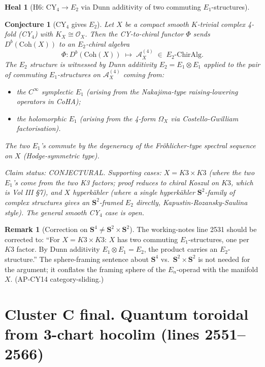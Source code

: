 \documentclass[11pt]{amsart}
\newtheorem{conjecture}[theorem]{Conjecture}
\theoremstyle{definition}
\newtheorem{heal}[attack]{Heal}
\newtheorem{remark}{Remark}
\providecommand{\Coh}{\mathrm{Coh}}
\providecommand{\Eone}{E_1}
\providecommand{\Etwo}{E_2}
\providecommand{\cO}{\mathcal{O}}
\providecommand{\bS}{\mathbf{S}}
\begin{document}
\begin{heal}[H6: CY$_4 \to \Etwo$ via Dunn additivity of two commuting $\Eone$-structures]\leavevmode

\begin{conjecture}[CY$_4$ gives $\Etwo$]\label{conj:cy4-e2}
Let $X$ be a compact smooth $K$-trivial complex 4-fold (CY$_4$) with
$K_X \cong \cO_X$. Then the CY-to-chiral functor $\Phi$ sends
$D^b(\Coh(X))$ to an $\Etwo$-chiral algebra
\[
 \Phi \colon D^b(\Coh(X)) \;\longmapsto\; \mathcal{A}^{(4)}_X
 \;\in\; \Etwo\text{-}\mathrm{ChirAlg}.
\]
The $\Etwo$ structure is witnessed by Dunn additivity
$\Etwo = \Eone \otimes \Eone$ applied to the pair of commuting
$\Eone$-structures on $\mathcal{A}^{(4)}_X$ coming from:
\begin{itemize}
 \item the $C^\infty$ symplectic $\Eone$ (arising from the
   Nakajima-type raising-lowering operators in CoHA);
 \item the holomorphic $\Eone$ (arising from the 4-form
   $\Omega_X$ via Costello-Gwilliam factorisation).
\end{itemize}
The two $\Eone$'s commute by the degeneracy of the
Fröhlicher-type spectral sequence on $X$ (Hodge-symmetric type).

\noindent\emph{Claim status: CONJECTURAL.} Supporting cases: $X = K3 \times K3$
(where the two $\Eone$'s come from the two K3 factors; proof
{\em reduces} to chiral Koszul on $K3$, which is Vol III \S7), and
$X$ hyperkähler (where a single hyperkähler $\bS^2$-family of complex
structures gives an $\bS^2$-framed $\Etwo$ directly, Kapustin-Rozansky-Saulina
style). The general smooth CY$_4$ case is open.
\end{conjecture}

\begin{remark}[Correction on $\bS^4 \neq \bS^2 \times \bS^2$]
The working-notes line 2531 should be corrected to: ``For
$X = K3 \times K3$: $X$ has two commuting $\Eone$-structures, one per
$K3$ factor. By Dunn additivity $\Eone \otimes \Eone = \Etwo$, the
product carries an $\Etwo$-structure.'' The sphere-framing sentence
about $\bS^4$ vs.~$\bS^2 \times \bS^2$ is not needed for the
argument; it conflates the framing sphere of the $E_n$-operad with
the manifold $X$. (AP-CY14 category-sliding.)
\end{remark}
\end{heal}

\section{Cluster C final. Quantum toroidal from 3-chart hocolim (lines 2551--2566)}
\end{document}
